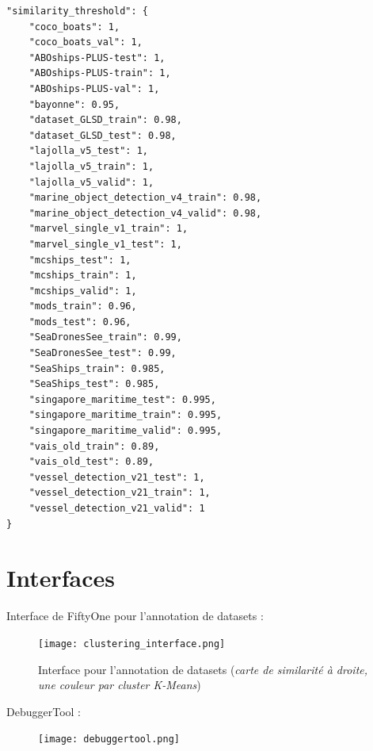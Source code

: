 \begin{verbatim}
"similarity_threshold": {
    "coco_boats": 1,
    "coco_boats_val": 1,
    "ABOships-PLUS-test": 1,
    "ABOships-PLUS-train": 1,
    "ABOships-PLUS-val": 1,
    "bayonne": 0.95,
    "dataset_GLSD_train": 0.98,
    "dataset_GLSD_test": 0.98,
    "lajolla_v5_test": 1,
    "lajolla_v5_train": 1,
    "lajolla_v5_valid": 1,
    "marine_object_detection_v4_train": 0.98,
    "marine_object_detection_v4_valid": 0.98,
    "marvel_single_v1_train": 1,
    "marvel_single_v1_test": 1,
    "mcships_test": 1,
    "mcships_train": 1,
    "mcships_valid": 1,
    "mods_train": 0.96,
    "mods_test": 0.96,
    "SeaDronesSee_train": 0.99,
    "SeaDronesSee_test": 0.99,
    "SeaShips_train": 0.985,
    "SeaShips_test": 0.985,
    "singapore_maritime_test": 0.995,
    "singapore_maritime_train": 0.995,
    "singapore_maritime_valid": 0.995,
    "vais_old_train": 0.89,
    "vais_old_test": 0.89,
    "vessel_detection_v21_test": 1,
    "vessel_detection_v21_train": 1,
    "vessel_detection_v21_valid": 1
}
\end{verbatim}
\label{seuils_similarite}

\pagebreak

\chapter{Interfaces}

\begin{landscape}
Interface de FiftyOne pour l'annotation de datasets : \\
    \begin{figure}[H]
        \centering
        \texttt{[image: clustering\_interface.png]}
        \caption{Interface pour l'annotation de datasets (\textit{carte de similarité à droite,
        une couleur par cluster K-Means})}
    \end{figure}\label{clustering_interface}
\end{landscape}

\pagebreak

\begin{landscape}
    DebuggerTool : \\
        \begin{figure}[H]
            \centering
            \texttt{[image: debuggertool.png]}
        \end{figure}\label{debuggertool}
    \end{landscape}
